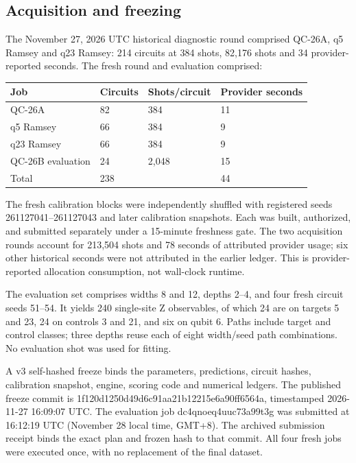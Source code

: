 \documentclass[11pt,a4paper]{article}
\begin{document}
\subsection{Acquisition and freezing}

The November 27, 2026 UTC historical diagnostic round comprised QC-26A, q5 Ramsey and q23 Ramsey: 214 circuits at 384 shots, 82,176 shots and 34 provider-reported seconds. The fresh round and evaluation comprised:

\begin{center}
\centering
\normalsize
\begin{tabularx}{\linewidth}{@{}YYYY@{}}
\toprule
Job & Circuits & Shots/circuit & Provider seconds \\
\midrule
QC-26A & 82 & 384 & 11 \\
q5 Ramsey & 66 & 384 & 9 \\
q23 Ramsey & 66 & 384 & 9 \\
QC-26B evaluation & 24 & 2,048 & 15 \\
Total & 238 &  & 44 \\
\bottomrule
\end{tabularx}
\end{center}

The fresh calibration blocks were independently shuffled with registered seeds 261127041--261127043 and later calibration snapshots. Each was built, authorized, and submitted separately under a 15-minute freshness gate. The two acquisition rounds account for 213,504 shots and 78 seconds of attributed provider usage; six other historical seconds were not attributed in the earlier ledger. This is provider-reported allocation consumption, not wall-clock runtime.

The evaluation set comprises widths 8 and 12, depths 2--4, and four fresh circuit seeds 51--54. It yields 240 single-site Z observables, of which 24 are on targets 5 and 23, 24 on controls 3 and 21, and six on qubit 6. Paths include target and control classes; three depths reuse each of eight width/seed path combinations. No evaluation shot was used for fitting.

A v3 self-hashed freeze binds the parameters, predictions, circuit hashes, calibration snapshot, engine, scoring code and numerical ledgers. The published freeze commit is 1f120d1250d49d6c91aa21b12215e6a90ff6564a, timestamped 2026-11-27 16:09:07 UTC. The evaluation job dc4qnoeq4uuc73a99t3g was submitted at 16:12:19 UTC (November 28 local time, GMT+8). The archived submission receipt binds the exact plan and frozen hash to that commit. All four fresh jobs were executed once, with no replacement of the final dataset.
\end{document}
